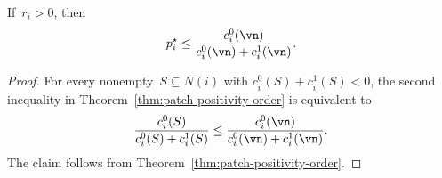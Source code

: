 \begin{corollary}
\label{cor:critical-profile-empty-bound}
If~$r_i>0$, then
\begin{equation*}
p_i^\star
\leq
\frac{c_i^0(\vn)}{c_i^0(\vn)+c_i^1(\vn)}.
\end{equation*}
\end{corollary}

\begin{proof}
For every nonempty~$S\subseteq N(i)$ with
$c_i^0(S)+c_i^1(S)<0$, the second inequality in
Theorem~\ref{thm:patch-positivity-order} is equivalent to
\begin{equation*}
\frac{c_i^0(S)}{c_i^0(S)+c_i^1(S)}
\leq
\frac{c_i^0(\vn)}{c_i^0(\vn)+c_i^1(\vn)}.
\end{equation*}
The claim follows from Theorem~\ref{thm:patch-positivity-order}.
\end{proof}